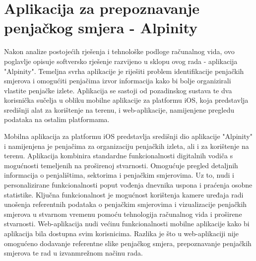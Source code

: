 \chapter{Aplikacija za prepoznavanje penjačkog smjera - Alpinity}

Nakon analize postojećih rješenja i tehnološke podloge računalnog vida, ovo poglavlje opisuje softversko rješenje razvijeno u sklopu ovog rada - aplikacija "Alpinity". Temeljna svrha aplikacije je riješiti problem identifikacije penjačkih smjerova i omogućiti penjačima izvor informacija kako bi bolje organizirali vlastite penjačke izlete. Aplikacija se sastoji od pozadinskog sustava te dva korisnička sučelja u obliku mobilne aplikacije za platformu iOS, koja predstavlja središnji alat za korištenje na terenu, i web-aplikacije, namijenjene pregledu podataka na ostalim platformama. 

Mobilna aplikacija za platformu iOS predstavlja središnji dio aplikacije "Alpinity" i namijenjena je penjačima za organizaciju penjačkih izleta, ali i za korištenje na terenu. Aplikacija kombinira standardne funkcionalnosti digitalnih vodiča s mogućnosti temeljenih na proširenoj stvarnosti. Omogućuje pregled detaljnih informacija o penjalištima, sektorima i penjačkim smjerovima. Uz to, nudi i personalizirane funkcionalnosti poput vođenja dnevnika uspona i praćenja osobne statistike. 
Ključna funkcionalnost je mogućnost korištenja kamere uređaja radi unošenja referentnih podataka o penjačkim smjerovima i vizualizacije penjačkih smjerova u stvarnom vremenu pomoću tehnologija računalnog vida i proširene stvarnosti. Web-aplikacija nudi većinu funkcionalnosti mobilne aplikacije kako bi aplikacija bila dostupna svim korisnicima. Razlika je što u web-aplikaciji nije omogućeno dodavanje referentne slike penjačkog smjera, prepoznavanje penjačkih smjerova te rad u izvanmrežnom načinu rada. 




    






